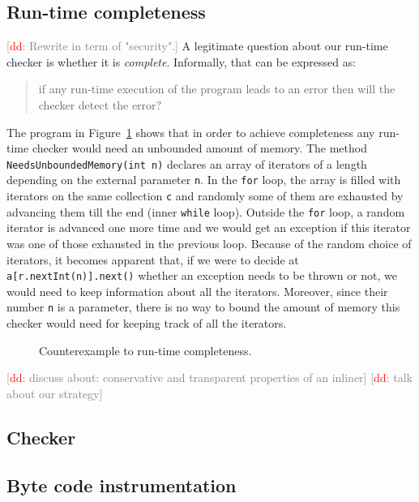 \documentclass{llncs} %
\newcommand{\noterg}[2]{\textcolor{gray}{[\textcolor{red}{#1}: #2]}}
\newcommand{\dd}[1]{\noterg{dd}{#1}}
\newcommand{\dinocomment}[1]{\dd{#1}}
\begin{document}
\subsection{Run-time completeness}
\dinocomment{Rewrite in term of "security".}
A legitimate question about our run-time checker is whether it is {\em complete}. Informally, that can be expressed as:
\begin{quote}
if any run-time execution of the program leads to an error then will the checker detect the error?
\end{quote}
The program in Figure~\ref{fig:completeness} shows that in order to
achieve completeness any run-time checker would need an unbounded
amount of memory. The method {\tt NeedsUnboundedMemory(int n)}
declares an array of iterators of a length depending on the external parameter {\tt n}.  In the {\tt for} loop, the array is filled with iterators on the same collection {\tt c} and randomly some of them are exhausted by advancing them till the end (inner {\tt while} loop).
Outside the {\tt for} loop, a random iterator is advanced one more time and we would get an exception if this iterator 
was one of those exhausted in the previous loop. Because of the random choice of iterators, it becomes apparent that, 
if we were to decide at {\tt a[r.nextInt(n)].next()} whether an exception needs to be thrown or not, we would need to keep information about all the iterators. Moreover, since their number {\tt n} is a parameter, there is no way to bound the amount of memory this checker would need for keeping track of all the iterators. 
%
\begin{figure}[htbp]
\begin{center}

\caption{Counterexample to run-time completeness.}
\label{fig:completeness}
\end{center}
\end{figure}

\dinocomment{discuss about: conservative and transparent properties of an inliner}
\dinocomment{talk about our strategy}
\subsection{Checker}
\subsection{Byte code instrumentation}
\end{document}

